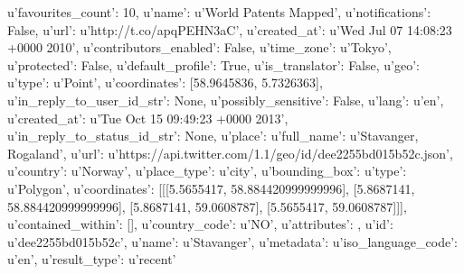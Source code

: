 \begin{listing}
{{u'favourites_count': 10, u'name': u'World Patents Mapped', u'notifications':
False, u'url': u'http://t.co/apqPEHN3aC', u'created_at': u'Wed Jul 07 14:08:23
+0000 2010', u'contributors_enabled': False, u'time_zone': u'Tokyo',
u'protected': False, u'default_profile': True, u'is_translator': False}, u'geo':
{u'type': u'Point', u'coordinates': [58.9645836, 5.7326363]},
u'in_reply_to_user_id_str': None, u'possibly_sensitive': False, u'lang': u'en',
u'created_at': u'Tue Oct 15 09:49:23 +0000 2013', u'in_reply_to_status_id_str':
None, u'place': {u'full_name': u'Stavanger, Rogaland', u'url':
u'https://api.twitter.com/1.1/geo/id/dee2255bd015b52c.json', u'country':
u'Norway', u'place_type': u'city', u'bounding_box': {u'type': u'Polygon',
u'coordinates': [[[5.5655417, 58.884420999999996], [5.8687141,
58.884420999999996], [5.8687141, 59.0608787], [5.5655417, 59.0608787]]]},
u'contained_within': [], u'country_code': u'NO', u'attributes': {}, u'id':
u'dee2255bd015b52c', u'name': u'Stavanger'}, u'metadata': {u'iso_language_code':
u'en', u'result_type': u'recent'}}

\end{listing}
